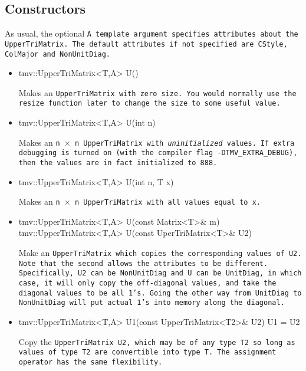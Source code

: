 \subsection{Constructors}
\label{TriMatrix_Constructors}

As usual, the optional \tt{A} template argument specifies attributes about
the \tt{UpperTriMatrix}.  The default attributes if not specified are
\tt{CStyle}, \tt{ColMajor} and \tt{NonUnitDiag}.

\begin{itemize}

\item
\begin{tmvcode}
tmv::UpperTriMatrix<T,A> U()
\end{tmvcode}
Makes an \tt{UpperTriMatrix} with zero size.  You would normally use the \tt{resize} function later to
change the size to some useful value.

\item 
\begin{tmvcode}
tmv::UpperTriMatrix<T,A> U(int n)
\end{tmvcode}
Makes an \tt{n} $\times$ \tt{n} \tt{UpperTriMatrix} with {\em uninitialized} values.
If extra debugging is turned on (with the compiler flag \tt{-DTMV\_EXTRA\_DEBUG}), then the values are in fact initialized to 888.  

\item
\begin{tmvcode}
tmv::UpperTriMatrix<T,A> U(int n, T x)
\end{tmvcode}
Makes an \tt{n} $\times$ \tt{n} \tt{UpperTriMatrix} with all values equal to \tt{x}.

\item 
\begin{tmvcode}
tmv::UpperTriMatrix<T,A> U(const Matrix<T>& m)
tmv::UpperTriMatrix<T,A> U(const UperTriMatrix<T>& U2)
\end{tmvcode}
Make an \tt{UpperTriMatrix} which copies the corresponding values of
\tt{U2}.  Note that the second allows the attributes to be different.
Specifically, \tt{U2} can be \tt{NonUnitDiag} and \tt{U} can be \tt{UnitDiag},
in which case, it will only copy the off-diagonal values, and take
the diagonal values to be all 1's.  Going the other way from \tt{UnitDiag}
to \tt{NonUnitDiag} will put actual 1's into memory along the diagonal.

\item
\begin{tmvcode}
tmv::UpperTriMatrix<T,A> U1(const UpperTriMatrix<T2>& U2)
U1 = U2
\end{tmvcode}
Copy the \tt{UpperTriMatrix U2}, which may be of any type \tt{T2} so long
as values of type \tt{T2} are convertible into type \tt{T}.
The assignment operator has the same flexibility.


\end{itemize}
